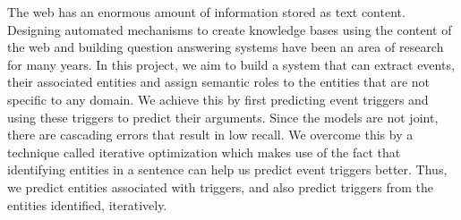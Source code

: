 The web has an enormous amount of information stored as text content. Designing automated mechanisms to create knowledge bases using the content of the web and building question answering systems have been an area of research for many years. In this project, we aim to build a system that can extract events, their associated entities and assign semantic roles to the entities that are not specific to any domain. We achieve this by first predicting event triggers and using these triggers to predict their arguments. Since the models are not joint, there are cascading errors that result in low recall. We overcome this by a technique called iterative optimization which makes use of the fact that identifying entities in a sentence can help us predict event triggers better. Thus, we predict entities associated with triggers, and also predict triggers from the entities identified, iteratively.